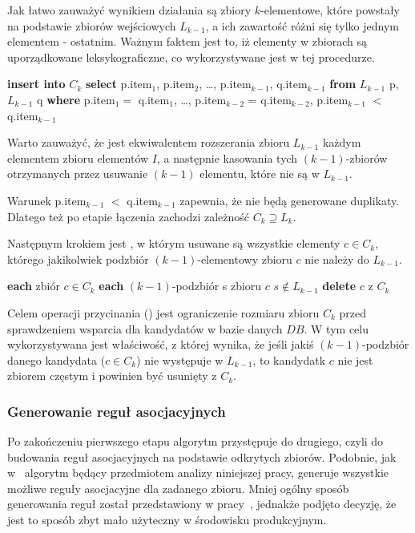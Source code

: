 Jak łatwo zauważyć wynikiem działania  są zbiory $k$-elementowe, które powstały na podstawie zbiorów wejściowych $L_{k-1}$, a ich zawartość różni się tylko jednym elementem - ostatnim. Ważnym faktem jest to, iż elementy w zbiorach są uporządkowane leksykograficzne, co wykorzystywane jest w tej procedurze.

\begin{codebox}
	\li \textbf{insert into} $C_k$
	\li \textbf{select} p.item$_1$, p.item$_2$, \dots, p.item$_{k-1}$, q.item$_{k-1}$
	\li \textbf{from} $L_{k-1}$ p, $L_{k-1}$ q
	\li \textbf{where} p.item$_1 = $ q.item$_1$, \dots, p.item$_{k-2}$ = q.item$_{k-2}$, p.item$_{k-1}$ $<$ q.item$_{k-1}$
\end{codebox}

Warto zauważyć, że  jest ekwiwalentem rozszerania zbioru $L_{k-1}$ każdym elementem zbioru elementów $I$, a następnie kasowania tych $(k-1)$-zbiorów otrzymanych przez usuwanie $(k-1)$ elementu, które nie są w $L_{k-1}$. 

Warunek p.item$_{k-1}$ $<$ q.item$_{k-1}$ zapewnia, że nie będą generowane duplikaty. Dlatego też po etapie łączenia zachodzi zależność $C_k \supseteq L_k$.

Następnym krokiem jest , w którym usuwane są wszystkie elementy $c \in C_k$, którego jakikolwiek podzbiór $(k-1)$-elementowy zbioru $c$ nie należy do $L_{k-1}$.

\begin{codebox}
		\li \For \textbf{each} zbiór $c \in C_k$ 
		\li \Do
			\li \For \textbf{each} $(k-1)$-podzbiór s zbioru $c$
					\li \Do 
						\If $s \notin L_{k-1}$
						\li \Then
							\textbf{delete} $c$ z $C_k$
						\End
					\End
		\End
\end{codebox}

Celem operacji przycinania () jest ograniczenie rozmiaru zbioru $C_k$ przed sprawdzeniem wsparcia dla kandydatów w bazie danych $DB$. W tym celu wykorzystywana jest właściwość, z której wynika, że jeśli jakiś $(k-1)$-podzbiór danego kandydata ($c \in C_k$) nie występuje w $L_{k-1}$, to kandydatk $c$ nie jest zbiorem częstym i powinien być usunięty z $C_k$.

\subsubsection{Generowanie reguł asocjacyjnych}
Po zakończeniu pierwszego etapu algorytm przystępuje do drugiego, czyli do budowania reguł asocjacyjnych na podstawie odkrytych zbiorów. Podobnie, jak w~\cite{Apriori:Main} algorytm będący przedmiotem analizy niniejszej pracy, generuje wszystkie możliwe reguły asocjacyjne dla zadanego zbioru. Mniej ogólny sposób generowania reguł został przedstawiony w pracy~\cite{Problem:Statement}, jednakże podjęto decyzję, że jest to sposób zbyt mało użyteczny w środowisku produkcyjnym.

